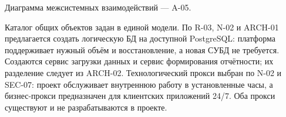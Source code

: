 \documentclass[10pt,a4paper]{article}
\begin{document}
Диаграмма межсистемных взаимодействий --- A-05.

Каталог общих объектов задан в единой модели. По R-03, N-02 и ARCH-01 предлагается создать логическую БД на доступной PostgreSQL: платформа поддерживает нужный объём и восстановление, а новая СУБД не требуется. Создаются сервис загрузки данных и сервис формирования отчётности; их разделение следует из ARCH-02. Технологический прокси выбран по N-02 и SEC-07: проект обслуживает внутреннюю работу в установленные часы, а бизнес-прокси предназначен для клиентских приложений 24/7. Оба прокси существуют и не разрабатываются в проекте.

\end{document}
